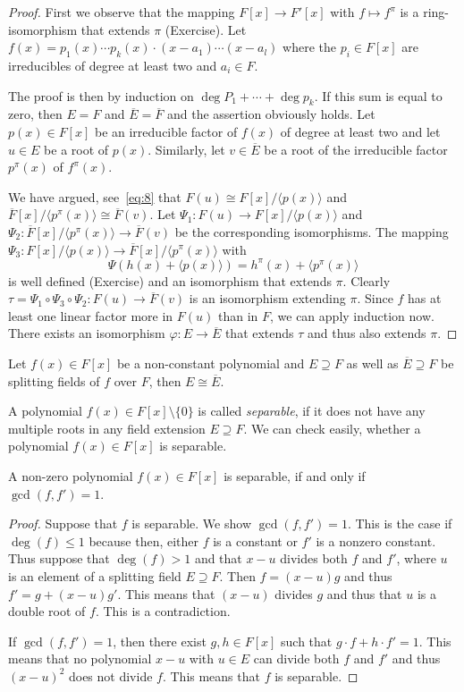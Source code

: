 \begin{proof}
  First we observe that the mapping $ F[x] → F'[x]$ with $f ↦ f^π$ is a ring-isomorphism that extends $π$ (Exercise).
  Let $f(x) = p_1(x) \cdots p_k(x) ⋅ (x-a_1) \cdots (x-a_l)$ where the $p_i∈ F[x]$ are irreducibles of degree at least two and $a_i ∈F$. 
  
  The proof is then by induction on $\deg P_1 + \cdots + \deg p_k$. If this sum is equal to zero,  then $E = F$ and $\overline{E} = \overline{F}$ and the assertion obviously holds. Let $p(x)∈ F[x]$  be an irreducible factor of $f(x)$ of degree at least two and let $u ∈ E$ be a root of $p(x)$. Similarly, let $v ∈ \overline{E}$ be a root of the irreducible factor $p^π(x)$ of $f^π(x)$.

  We have argued, see~\eqref{eq:8} that $F(u) ≅ F[x] / 〈 p(x) 〉$ and $\overline{F}[x] / 〈p^π(x)〉 ≅ \overline{F}(v)$. Let $Ψ_1: F(u) → F[x] / 〈 p(x) 〉$ and $Ψ_2: \overline{F}[x] / 〈p^π(x)〉 →  \overline{F}(v)$ be the corresponding isomorphisms.   The  mapping  $Ψ_3: F[x] / 〈p(x)〉 → \overline{F}[x] / 〈p^π(x) 〉$ with 
  \begin{equation}
    \label{eq:11}
    Ψ (h(x) + 〈p(x) 〉 ) = h^π(x) + 〈p^π(x)〉
  \end{equation}
  is well defined (Exercise) 
  and an isomorphism that extends $π$. Clearly $ τ = Ψ_1 \circ  Ψ_3 \circ Ψ_2: F(u) → \overline{F}(v)$ is an isomorphism extending $π$. Since $f$ has at least one linear factor more in $F(u)$ than in $F$, we can apply induction now. There exists an isomorphism $φ: E → \overline{E}$ that extends $τ$ and thus also extends $π$.       
\end{proof}


\begin{corollary}
  \label{co:1}
  Let $f(x) ∈ F[x]$ be a non-constant polynomial and $E ⊇F$ as well as $\overline{E} ⊇F$ be splitting fields of $f$ over $F$, then $E ≅ \overline{E}$. 
\end{corollary}

A polynomial $f(x) ∈ F[x] \setminus\{0\}$ is called \emph{separable}, if it does not have any multiple roots in any field extension $E ⊇F$. We can check easily, whether a polynomial $f(x) ∈F[x]$ is separable. 
\begin{theorem}
  \label{thr:14}
  A non-zero polynomial $f(x) ∈ F[x]$ is separable, if and only if $\gcd(f,f') = 1$. 
\end{theorem}

\begin{proof}
  Suppose that $f$ is separable. We show $\gcd(f,f') = 1$. This is the case if $\deg(f)≤1$ because then, either $f$ is a constant or $f'$ is a nonzero constant.   Thus suppose that $\deg(f)>1$ and that  $x-u$ divides both $f$ and $f'$, where $u$ is an element of a splitting field $E ⊇ F$. Then $f = (x-u) g$  and thus $f'= g + (x-u) g'$. This means that $(x-u)$ divides $g$ and thus that $u$ is a double root of $f$. This is a contradiction. 

  If $\gcd(f,f') = 1$, then there exist $g,h∈ F[x]$ such that $g ⋅ f + h ⋅f'=1$. This means that no polynomial $x-u$ with $u ∈E$ can divide both $f$ and $f'$ and thus $(x-u)^2$ does not divide $f$. This means that  $f$ is separable.
\end{proof}

